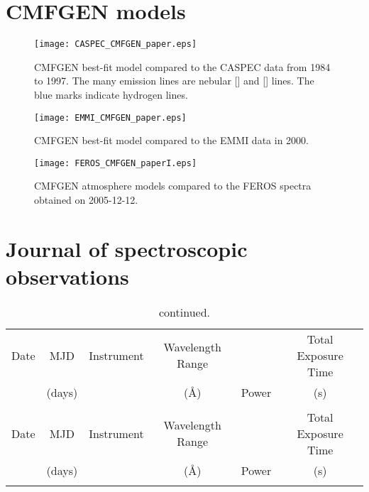 \documentclass[structabstract]{aa}
\begin{document}
\begin{appendix}

\section{CMFGEN models}
\label{appendix:models}

\begin{figure*}
\centering
\texttt{[image: CASPEC\_CMFGEN\_paper.eps]}
     \caption{CMFGEN best-fit model compared to the CASPEC data from 1984 to 1997. The many emission lines are nebular [] and [] lines. The blue marks indicate hydrogen lines.}\label{figure:CMFGEN_CASPEC}
\end{figure*}

\begin{figure*}
\centering
\texttt{[image: EMMI\_CMFGEN\_paper.eps]}
     \caption{CMFGEN best-fit model compared to the EMMI data in 2000.}\label{figure:CMFGEN_EMMI}
\end{figure*}

\begin{figure*}
\centering
\texttt{[image: FEROS\_CMFGEN\_paperI.eps]}
     \caption{CMFGEN atmosphere models compared to the FEROS spectra obtained on 2005-12-12.}\label{figure:CMFGEN_FEROS}
\end{figure*}

\section{Journal of spectroscopic observations}
\label{appendix:journal}

\begin{longtable}{cccccc}
\caption{Journal of spectroscopic observations.\label{table:journal}}\\
\hline\hline \setlength{\tabcolsep}{4pt}
Date & MJD  & Instrument   & Wavelength Range & \centering{Spectral Resolving} & Total Exposure Time   \\ %
 & (days)  & & (\AA) &  \multicolumn{1}{c}{Power} & (s)  \\ %
\hline
\endfirsthead
\caption{continued.}\\
\hline\hline
Date & MJD  & Instrument   & Wavelength Range & \centering{Spectral Resolving} & Total Exposure Time   \\ %
 & (days)  & & (\AA) &  \multicolumn{1}{c}{Power} & (s)  \\ %
 \hline
\endhead
\hline
\endfoot


\end{longtable}
\end{appendix}
\end{document}
